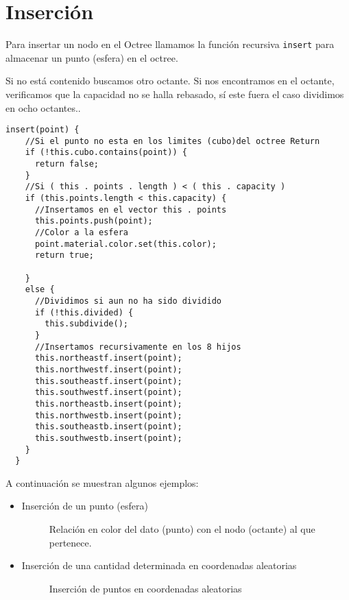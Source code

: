 \section{Inserción}
Para insertar un nodo en el Octree llamamos la función recursiva \verb!insert! para almacenar un punto (esfera) en el octree.

Si no está contenido buscamos otro octante. Si nos encontramos en el octante, verificamos que la capacidad no se halla rebasado, sí este fuera el caso dividimos en ocho octantes.\cite{samet}.
\begin{lstlisting}[caption=El método Insert(point)]
  insert(point) {
    //Si el punto no esta en los limites (cubo)del octree Return
    if (!this.cubo.contains(point)) {
      return false;
    }
    //Si ( this . points . length ) < ( this . capacity )
    if (this.points.length < this.capacity) {
      //Insertamos en el vector this . points
      this.points.push(point);
      //Color a la esfera
      point.material.color.set(this.color);
      return true;

    }
    else {
      //Dividimos si aun no ha sido dividido
      if (!this.divided) {
        this.subdivide();
      }
      //Insertamos recursivamente en los 8 hijos
      this.northeastf.insert(point);
      this.northwestf.insert(point);
      this.southeastf.insert(point);
      this.southwestf.insert(point);
      this.northeastb.insert(point);
      this.northwestb.insert(point);
      this.southeastb.insert(point);
      this.southwestb.insert(point);
    }
  }
\end{lstlisting}

A continuación se muestran algunos ejemplos:
\begin{itemize}
    \item Inserción de un punto (esfera)
    \begin{figure}[H]
      \centering
      \caption{Relación en color del dato (punto) con el nodo (octante) al que pertenece.}
      \label{fig:insert01}
    \end{figure}
    \item Inserción de una cantidad determinada en coordenadas aleatorias
    \begin{figure}[H]
      \centering
      \caption{Inserción de puntos en coordenadas aleatorias}
      \label{fig:insert02}
    \end{figure}
\end{itemize}

